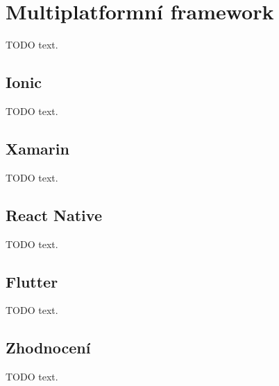 \section{Multiplatformní framework}

TODO text.








\subsection{Ionic}

TODO text.

\subsection{Xamarin}

TODO text.

\subsection{React Native}

TODO text.

\subsection{Flutter}






TODO text.

\subsection{Zhodnocení}

TODO text.
